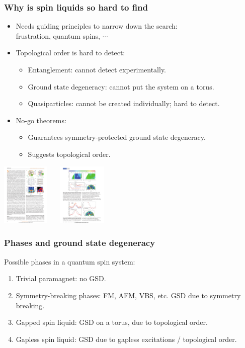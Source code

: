 \documentclass[xcolor=table, 10pt, aspectratio=169]{beamer}
\begin{document}
\begin{frame}
\frametitle{Why is spin liquids so hard to find}
\begin{itemize}
\item Needs guiding principles to narrow down the search:\\
frustration, quantum spins, $\cdots$
\item Topological order is hard to detect:
\begin{itemize}
\item Entanglement: cannot detect experimentally.
\item Ground state degeneracy: cannot put the system on a torus.
\item Quasiparticles: cannot be created individually; hard to detect.
\end{itemize}
\item No-go theorems:
\begin{itemize}
\item Guarantees symmetry-protected ground state degeneracy.
\item Suggests topological order.
\end{itemize}
\end{itemize}

\begin{center}
  \includegraphics[height=3cm]{../spinexp/spinwaveins}~~~
  \includegraphics[height=3cm]{../spinexp/continuumins}
\end{center}
\end{frame}

\begin{frame}
\frametitle{Phases and ground state degeneracy}
Possible phases in a quantum spin system:
\begin{enumerate}
  \item<1-4> Trivial paramagnet: no GSD.
  \item<2-> Symmetry-breaking phases: FM, AFM, VBS, etc. GSD due to symmetry breaking.
  \item<3-> Gapped spin liquid: GSD on a torus, due to topological order.
  \item<4-> Gapless spin liquid: GSD due to gapless excitations / topological order.
\end{enumerate}
\end{frame}
\end{document}
